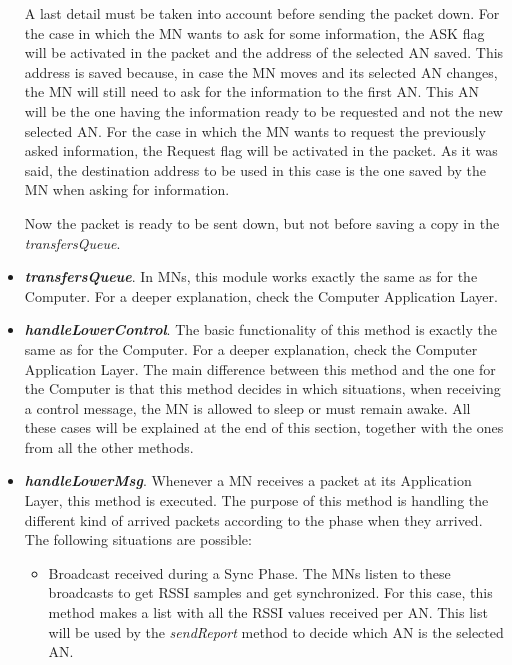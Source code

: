 \begin{itemize}
  A last detail must be taken into account before sending the packet down. For the case in which the \ac{MN} wants to ask for some information, the 
  ASK flag will be activated in the packet and the address of the selected \ac{AN} saved. This address is saved because, in case the \ac{MN} moves 
  and its selected \ac{AN} changes, the \ac{MN} will still need to ask for the information to the first \ac{AN}. This \ac{AN} will be the one 
  having the information ready to be requested and not the new selected \ac{AN}. For the case in which the \ac{MN} wants to request the previously 
  asked information, the Request flag will be activated in the packet. As it was said, the destination address to be used in this case is the 
  one saved by the \ac{MN} when asking for information.

  Now the packet is ready to be sent down, but not before saving a copy in the \textit{transfersQueue}.

  \item \textbf{\textit{transfersQueue}}. In \acp{MN}, this module works exactly the same as for the Computer. For a deeper explanation, check
  the Computer Application Layer.

  \item \textbf{\textit{handleLowerControl}}. The basic functionality of this method is exactly the same as for the Computer. For a deeper explanation, 
  check the Computer Application Layer. The main difference between this method and the one for the Computer is that this method decides in which 
  situations, when receiving a control message, the \ac{MN} is allowed to sleep or must remain awake. All these cases will be explained at the end of this
  section, together with the ones from all the other methods.

  \item \textbf{\textit{handleLowerMsg}}. Whenever a \ac{MN} receives a packet at its Application Layer, this method is executed. The purpose
  of this method is handling the different kind of arrived packets according to the phase when they arrived. The following situations are possible:
  \begin{itemize}
    \item Broadcast received during a Sync Phase. The \acp{MN} listen to these broadcasts to get \ac{RSSI} samples and get synchronized. For this 
    case, this method makes a list with all the \ac{RSSI} values received per \ac{AN}. This list will be used by the \textit{sendReport} method to 
    decide which \ac{AN} is the selected \ac{AN}.


\end{itemize}
\end{itemize}
